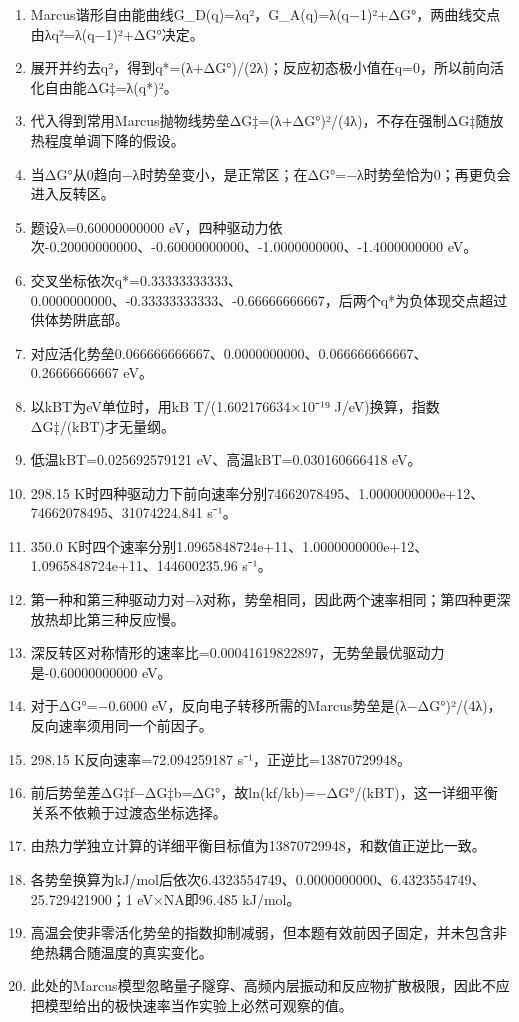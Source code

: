 \documentclass[UTF8,11pt,a4paper]{ctexart}
\begin{document}
\begin{enumerate}
\item Marcus谐形自由能曲线G\_D(q)=λq²，G\_A(q)=λ(q−1)²+ΔG°，两曲线交点由λq²=λ(q−1)²+ΔG°决定。
\item 展开并约去q²，得到q*=(λ+ΔG°)/(2λ)；反应初态极小值在q=0，所以前向活化自由能ΔG‡=λ(q*)²。
\item 代入得到常用Marcus抛物线势垒ΔG‡=(λ+ΔG°)²/(4λ)，不存在强制ΔG‡随放热程度单调下降的假设。
\item 当ΔG°从0趋向−λ时势垒变小，是正常区；在ΔG°=−λ时势垒恰为0；再更负会进入反转区。
\item 题设λ=0.60000000000 eV，四种驱动力依次-0.20000000000、-0.60000000000、-1.0000000000、-1.4000000000 eV。
\item 交叉坐标依次q*=0.33333333333、0.0000000000、-0.33333333333、-0.66666666667，后两个q*为负体现交点超过供体势阱底部。
\item 对应活化势垒0.066666666667、0.0000000000、0.066666666667、0.26666666667 eV。
\item 以kBT为eV单位时，用kB T/(1.602176634×10⁻¹⁹ J/eV)换算，指数ΔG‡/(kBT)才无量纲。
\item 低温kBT=0.025692579121 eV、高温kBT=0.030160666418 eV。
\item 298.15 K时四种驱动力下前向速率分别74662078495、1.0000000000e+12、74662078495、31074224.841 s⁻¹。
\item 350.0 K时四个速率分别1.0965848724e+11、1.0000000000e+12、1.0965848724e+11、144600235.96 s⁻¹。
\item 第一种和第三种驱动力对−λ对称，势垒相同，因此两个速率相同；第四种更深放热却比第三种反应慢。
\item 深反转区对称情形的速率比=0.00041619822897，无势垒最优驱动力是-0.60000000000 eV。
\item 对于ΔG°=−0.6000 eV，反向电子转移所需的Marcus势垒是(λ−ΔG°)²/(4λ)，反向速率须用同一个前因子。
\item 298.15 K反向速率=72.094259187 s⁻¹，正逆比=13870729948。
\item 前后势垒差ΔG‡f−ΔG‡b=ΔG°，故ln(kf/kb)=−ΔG°/(kBT)，这一详细平衡关系不依赖于过渡态坐标选择。
\item 由热力学独立计算的详细平衡目标值为13870729948，和数值正逆比一致。
\item 各势垒换算为kJ/mol后依次6.4323554749、0.0000000000、6.4323554749、25.729421900；1 eV×NA即96.485 kJ/mol。
\item 高温会使非零活化势垒的指数抑制减弱，但本题有效前因子固定，并未包含非绝热耦合随温度的真实变化。
\item 此处的Marcus模型忽略量子隧穿、高频内层振动和反应物扩散极限，因此不应把模型给出的极快速率当作实验上必然可观察的值。
\end{enumerate}
\end{document}
